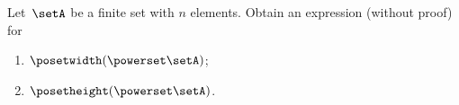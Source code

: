 \vfill
\begin{gradedexercise}
    \label{ex:MeasurePowerPoset}

    Let~$\setA$ be a finite set with $n$ elements.
    Obtain an expression (without proof) for
    \begin{enumerate}
        \item $\posetwidth(\powerset  \setA)$;
        \item $\posetheight(\powerset \setA)$.
    \end{enumerate}
\end{gradedexercise}


